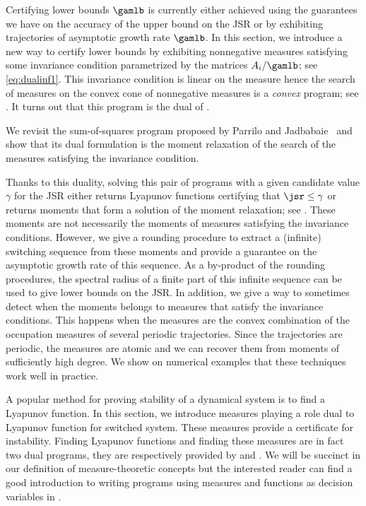 \documentclass[11pt,twoside,a4paper,openright]{uclouvain-thesis}
\begin{document}
Certifying lower bounds $\gamlb$ is currently either achieved using the guarantees we have on the accuracy of the upper bound on the JSR
or by exhibiting trajectories of asymptotic growth rate $\gamlb$.
In this section, we introduce a new way to certify lower bounds by exhibiting nonnegative measures satisfying some invariance condition parametrized by the matrices $A_i/\gamlb$; see \eqref{eq:dualinf1}.
This invariance condition is linear on the measure hence the search of measures on the convex cone of nonnegative measures is a \emph{convex} program; see .
It turns out that this program is the dual of .

We revisit the sum-of-squares program proposed by Parrilo and Jadbabaie~\cite{parrilo2008approximation} and show that its dual formulation is the moment relaxation of the search of the measures satisfying the invariance condition.

Thanks to this duality, solving this pair of programs with a given candidate value $\gamma$
for the JSR either returns Lyapunov functions certifying that
$\jsr \leq \gamma$ or returns moments that form a solution of the moment relaxation; see .
These moments are not necessarily the moments of measures satisfying the invariance conditions.
However, we give a rounding procedure to extract a (infinite) switching sequence from these moments
and provide a guarantee on the asymptotic growth rate of this sequence.
As a by-product of the rounding procedures, the spectral radius of a finite part of
this infinite sequence can be used to give lower bounds on the JSR.
In addition, we give a way to sometimes detect when the moments belongs to measures that satisfy the invariance conditions.
This happens when the measures are the convex combination of the occupation measures of several periodic trajectories.
Since the trajectories are periodic, the measures are atomic and we can recover them from moments of sufficiently high degree.
We show on numerical examples that these techniques work well in practice.


A popular method for proving stability of a dynamical system is to find a Lyapunov function.
In this section, we introduce measures playing a role dual to Lyapunov function for switched system.
These measures provide a certificate for instability.
Finding Lyapunov functions and finding these measures are in fact two dual programs, %
they are respectively provided by  and .
We will be succinct in our definition of measure-theoretic concepts but the interested reader can find a good introduction to writing programs using measures and functions as decision variables in \cite{Lasserre2009}.
\end{document}
